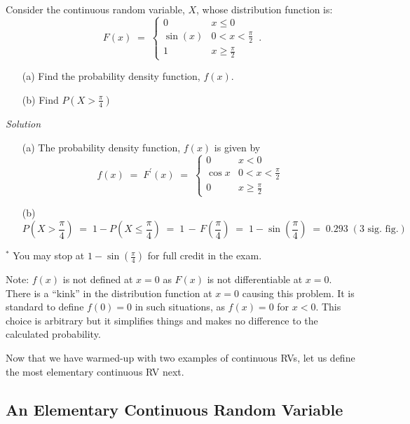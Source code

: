 \begin{example}\label{EgPdfSinxon0piover2}
{Consider the continuous random variable, $X$, whose distribution function is:
$$F(x)\;=\;\begin{cases}0&x\leq0\\\sin(x)& 0<x<\frac{\pi}{2}\\1&x\geq
  \frac{\pi}{2}\end{cases}\,.$$
\begin{enumerate}
\item[(a)] Find the probability density function, $f(x)$.
\item[(b)] Find $P\left(X>\frac{\pi}{4}\right)$
\end{enumerate}

{\em Solution}

\begin{enumerate}
\item[(a)] The probability density function, $f(x)$ is given by
$$f(x)\;=\;F^\prime(x)\;=\;\begin{cases}0&x < 0\\\cos x&
  0<x<\frac{\pi}{2}\\0&x\geq \frac{\pi}{2}\end{cases}$$
\item[(b)]
$$P\left(X>\frac{\pi}{4}\right)\;=\;1-P\left(X\leq
  \frac{\pi}{4}\right)\;=\;1\,-\,F\left(\frac{\pi}{4}\right)\;=\;1-\sin\left(\frac{\pi}{4}\right)\;=  \; 0.293 \;(\text{3 sig. fig.})$$
\end{enumerate}

$^*$ You may stop at $1-\sin\left(\frac{\pi}{4}\right)$ for full credit in the exam.

Note: $f(x)$  is not defined at $x=0$ as $F(x)$ is not
differentiable at $x=0$. There is a ``kink'' in the distribution
function at $x=0$ causing this problem. It is standard to define
$f(0)=0$ in such situations,  as $f(x)=0$ for $x<0$. This choice is arbitrary but it simplifies things
and makes no difference to the calculated probability.
}
\end{example}

Now that we have warmed-up with two examples of continuous RVs, let us define the most elementary continuous RV next.

\subsection{An Elementary Continuous Random Variable}\label{S:ElemContRV}

